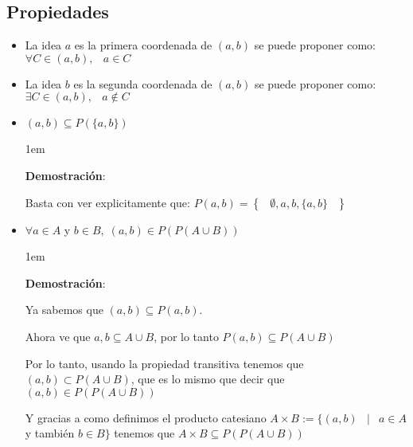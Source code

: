 \documentclass[12pt, fleqn]{report}                             %
\newenvironment{SmallIndentation}[1][0.75em]                    %
    {\begin{adjustwidth}{#1}{}\begin{footnotesize}}                 %
    {\end{footnotesize}\end{adjustwidth}}                           %
\DeclareMathOperator \Space {\quad}                             %
\DeclareMathOperator \MiniSpace {\;}                            %
\newcommand \Such {\MiniSpace|\MiniSpace}                       %
\newcommand{\Set}[1]{\left\{ \MiniSpace #1 \MiniSpace \right\}} %
\begin{document}
                    \subsection*{Propiedades}
                    \begin{itemize}
                        \item La idea $a$ es la primera coordenada de $(a, b)$ se puede
                            proponer como: $\forall C \in (a, b), \MiniSpace a \in C$
                        
                        \item La idea $b$ es la segunda coordenada de $(a, b)$ se puede
                            proponer como: $\exists C \in (a, b), \MiniSpace a \notin C$
                        
                        \item $(a,b) \subseteq P(\{a,b\})$

                            \begin{SmallIndentation}[1em]
                                \textbf{Demostración}:

                                Basta con ver explicitamente que:
                                $P({a,b}) = \Set{\emptyset, a, b, \{a, b\}}$

                            \end{SmallIndentation}


                        \item $\forall a \in A$ y $b \in B, \; (a,b) \in P(P(A \cup B))$

                            \begin{SmallIndentation}[1em]
                                \textbf{Demostración}:

                                Ya sabemos que $(a,b) \subseteq P({a,b})$.

                                Ahora ve que ${a,b} \subseteq A \cup B$, por lo
                                tanto $P({a,b}) \subseteq P(A \cup B)$

                                Por lo tanto, usando la propiedad transitiva tenemos que
                                $(a,b) \subset P(A \cup B)$, que es lo mismo que decir
                                que $(a,b) \in P(P(A \cup B))$


                                Y gracias a como definimos el producto catesiano 
                                $A \times B := \{ (a, b) \Such a \in A$ y también $ b \in B \}$
                                tenemos que $A \times B \subseteq P(P(A \cup B))$

                            \end{SmallIndentation}



                    \end{itemize}
\end{document}
